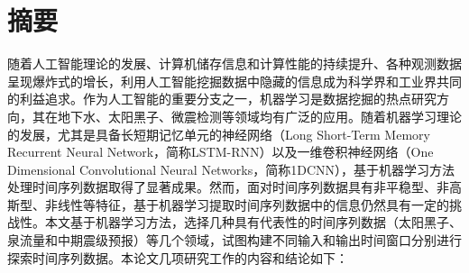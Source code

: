 \setlength{\headheight}{26pt}
\maketitle %
\MAKETITLE %
\makedeclaration %

\intobmk\chapter*{\texorpdfstring{摘\quad 要}{摘要}}
\setcounter{page}{1}
随着人工智能理论的发展、计算机储存信息和计算性能的持续提升、各种观测数据呈现爆炸式的增长，利用人工智能挖掘数据中隐藏的信息成为科学界和工业界共同的利益追求。作为人工智能的重要分支之一，机器学习是数据挖掘的热点研究方向，其在地下水、太阳黑子、微震检测等领域均有广泛的应用。随着机器学习理论的发展，尤其是具备长短期记忆单元的神经网络（Long Short-Term Memory Recurrent Neural Network，简称LSTM-RNN）以及一维卷积神经网络（One Dimensional Convolutional Neural Networks，简称1DCNN），基于机器学习方法处理时间序列数据取得了显著成果。然而，面对时间序列数据具有非平稳型、非高斯型、非线性等特征，基于机器学习提取时间序列数据中的信息仍然具有一定的挑战性。本文基于机器学习方法，选择几种具有代表性的时间序列数据（太阳黑子、泉流量和中期震级预报）等几个领域，试图构建不同输入和输出时间窗口分别进行探索时间序列数据。本论文几项研究工作的内容和结论如下：
